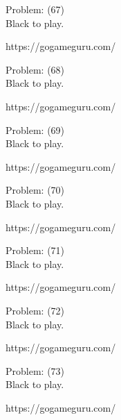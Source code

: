 \documentclass[11pt]{article}
\begin{document}
\begin{minipage}[t]{0.5\textwidth}
  {\centering
  
Problem: (67)\\
Black to play.

https://gogameguru.com/\\
  }
\end{minipage}
\begin{minipage}[t]{0.5\textwidth}
  {\centering
  
Problem: (68)\\
Black to play.

https://gogameguru.com/\\
  }
\end{minipage}
\begin{minipage}[t]{0.5\textwidth}
  {\centering
  
Problem: (69)\\
Black to play.

https://gogameguru.com/\\
  }
\end{minipage}
\begin{minipage}[t]{0.5\textwidth}
  {\centering
  
Problem: (70)\\
Black to play.

https://gogameguru.com/\\
  }
\end{minipage}
\begin{minipage}[t]{0.5\textwidth}
  {\centering
  
Problem: (71)\\
Black to play.

https://gogameguru.com/\\
  }
\end{minipage}
\begin{minipage}[t]{0.5\textwidth}
  {\centering
  
Problem: (72)\\
Black to play.

https://gogameguru.com/\\
  }
\end{minipage}
\begin{minipage}[t]{0.5\textwidth}
  {\centering
  
Problem: (73)\\
Black to play.

https://gogameguru.com/\\
  }
\end{minipage}
\end{document}
